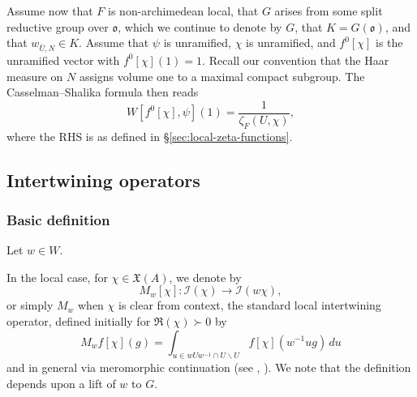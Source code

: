 \documentclass[reqno]{amsart}
\theoremstyle{plain} \newtheorem{theorem} {Theorem}
\theoremstyle{definition} \newtheorem{definition} [theorem] {Definition}
\theoremstyle{itplain} %
\numberwithin{equation}{section}
\numberwithin{theorem}{section}
\begin{document}
Assume now that $F$ is non-archimedean local, that $G$ arises from some split reductive group over $\mathfrak{o}$, which we continue to denote by $G$, that $K = G(\mathfrak{o})$, and that $w_{\bar{U},N} \in K$.  Assume that $\psi$ is unramified, $\chi$ is unramified, and $f^0[\chi]$ is the unramified vector with $f^0[\chi](1) = 1$.  Recall our convention that the Haar measure on $N$ assigns volume one to a maximal compact subgroup.  The Casselman--Shalika formula \cite[Thm 5.4]{MR581582} then reads
\begin{equation}\label{eq:wf0chi-psi1-casselman-shalika}
  W[f^0[\chi],\psi](1)
  =
  \frac{1}{\zeta_F(U,\chi)},
\end{equation}
where the RHS is as defined in \S\ref{sec:local-zeta-functions}.



\subsection{Intertwining operators}\label{sec:local-intertw-oper-four}

\subsubsection{Basic definition}\label{sec:basic-definition-intertwining-ops}
Let $w \in W$.

In the local case, for $\chi \in \mathfrak{X}(A)$, we denote by
\begin{equation*}
M_w[\chi] : \mathcal{I}(\chi) \rightarrow \mathcal{I}(w \chi),
\end{equation*}
or simply $M_w$ when $\chi$ is clear from context, the standard local intertwining operator, defined initially for $\Re(\chi) \succ 0$ by 
\begin{equation*}
  M_w f[\chi](g) = \int _{u \in
    w U w^{-1} \cap U \backslash  U} f[\chi](w^{-1} u g) \, d u
\end{equation*}
and in general via meromorphic continuation (see \cite[10.1.14]{MR1170566}, \cite[\S2.2]{MR610479}).  We note that the definition depends upon a lift of $w$ to $G$.
\end{document}
